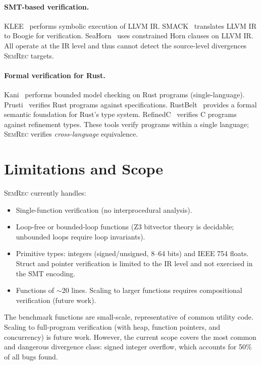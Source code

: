 \documentclass[11pt,a4paper]{article}
\begin{document}
\paragraph{SMT-based verification.}
KLEE~\cite{cadar2008klee} performs symbolic execution of LLVM IR.
SMACK~\cite{rakamaric2014smack} translates LLVM IR to Boogie for
verification.  SeaHorn~\cite{gurfinkel2015seahorn} uses constrained
Horn clauses on LLVM IR.  All operate at the IR level and thus
cannot detect the source-level divergences \textsc{SemRec} targets.

\paragraph{Formal verification for Rust.}
Kani~\cite{kani2022} performs bounded model checking on Rust programs
(single-language).  Prusti~\cite{astrauskas2022prusti} verifies Rust
programs against specifications.  RustBelt~\cite{jung2017rustbelt}
provides a formal semantic foundation for Rust's type system.
RefinedC~\cite{sammler2021refinedc} verifies C programs against
refinement types.  These tools verify programs within a single language;
\textsc{SemRec} verifies \emph{cross-language} equivalence.


\section{Limitations and Scope}\label{sec:limitations}

\textsc{SemRec} currently handles:
\begin{itemize}
  \item Single-function verification (no interprocedural analysis).
  \item Loop-free or bounded-loop functions (Z3 bitvector theory is
    decidable; unbounded loops require loop invariants).
  \item Primitive types: integers (signed/unsigned, 8--64 bits) and
    IEEE 754 floats.  Struct and pointer verification is limited
    to the IR level and not exercised in the SMT encoding.
  \item Functions of $\sim$20 lines.  Scaling to larger functions
    requires compositional verification (future work).
\end{itemize}

The benchmark functions are small-scale, representative of common
utility code.  Scaling to full-program verification (with heap, function
pointers, and concurrency) is future work.  However, the current scope
covers the most common and dangerous divergence class: signed integer
overflow, which accounts for 50\% of all bugs found.
\end{document}
